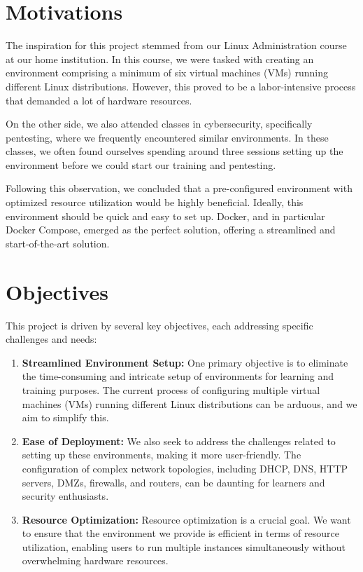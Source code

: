 \documentclass[a4paper,11pt,singlespacing]{article}
\begin{document}
\section{Motivations}
The inspiration for this project stemmed from our Linux Administration course at our home institution. In this course, we were tasked with creating an environment comprising a minimum of six virtual machines (VMs) running different Linux distributions. However, this proved to be a labor-intensive process that demanded a lot of hardware resources.\par
On the other side, we also attended classes in cybersecurity, specifically pentesting, where we frequently encountered similar environments. In these classes, we often found ourselves spending around three sessions setting up the environment before we could start our training and pentesting.\par
Following this observation, we concluded that a pre-configured environment with optimized resource utilization would be highly beneficial. Ideally, this environment should be quick and easy to set up. Docker, and in particular Docker Compose, emerged as the perfect solution, offering a streamlined and start-of-the-art solution.


\section{Objectives}
This project is driven by several key objectives, each addressing specific challenges and needs:

\begin{enumerate}
    \item \textbf{Streamlined Environment Setup:} One primary objective is to eliminate the time-consuming and intricate setup of environments for learning and training purposes. The current process of configuring multiple virtual machines (VMs) running different Linux distributions can be arduous, and we aim to simplify this.
    
    \item \textbf{Ease of Deployment:} We also seek to address the challenges related to setting up these environments, making it more user-friendly. The configuration of complex network topologies, including DHCP, DNS, HTTP servers, DMZs, firewalls, and routers, can be daunting for learners and security enthusiasts.
    
    \item \textbf{Resource Optimization:} Resource optimization is a crucial goal. We want to ensure that the environment we provide is efficient in terms of resource utilization, enabling users to run multiple instances simultaneously without overwhelming hardware resources.
\end{enumerate}
\end{document}
